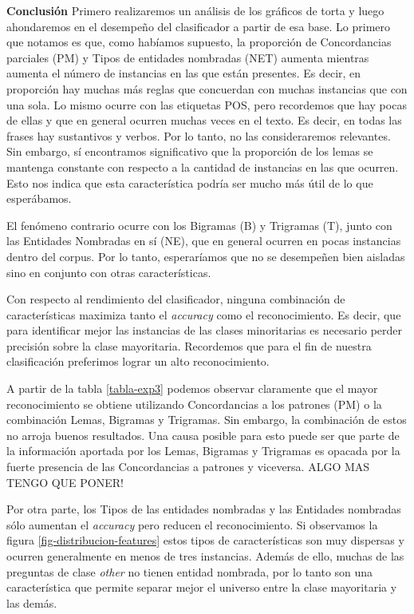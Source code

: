 \textbf{Conclusión} Primero realizaremos un análisis de los gráficos de torta y luego ahondaremos en el desempeño del clasificador a partir de esa base. Lo primero que notamos es que, como habíamos supuesto, la proporción de Concordancias parciales (PM) y Tipos de entidades nombradas (NET) aumenta mientras aumenta el número de instancias en las que están presentes. Es decir, en proporción hay muchas más reglas que concuerdan con muchas instancias que con una sola. Lo mismo ocurre con las etiquetas POS, pero recordemos que hay pocas de ellas y que en general ocurren muchas veces en el texto. Es decir, en todas las frases hay sustantivos y verbos. Por lo tanto, no las consideraremos relevantes. Sin embargo, sí encontramos significativo que la proporción de los lemas se mantenga constante con respecto a la cantidad de instancias en las que ocurren. Esto nos indica que esta característica podría ser mucho más útil de lo que esperábamos.

El fenómeno contrario ocurre con los Bigramas (B) y Trigramas (T), junto con las Entidades Nombradas en sí (NE), que en general ocurren en pocas instancias dentro del corpus. Por lo tanto, esperaríamos que no se desempeñen bien aisladas sino en conjunto con otras características.

Con respecto al rendimiento del clasificador, ninguna combinación de características maximiza tanto el \textit{accuracy} como el reconocimiento. Es decir, que para identificar mejor las instancias de las clases minoritarias es necesario perder precisión sobre la clase mayoritaria. Recordemos que para el fin de nuestra clasificación preferimos lograr un alto reconocimiento.

A partir de la tabla \ref{tabla-exp3} podemos observar claramente que el mayor reconocimiento se obtiene utilizando Concordancias a los patrones (PM) o la combinación Lemas, Bigramas y Trigramas. Sin embargo, la combinación de estos no arroja buenos resultados. Una causa posible para esto puede ser que parte de la información aportada por los Lemas, Bigramas y Trigramas es opacada por la fuerte presencia de las Concordancias a patrones y viceversa. ALGO MAS TENGO QUE PONER!

Por otra parte, los Tipos de las entidades nombradas y las Entidades nombradas sólo aumentan el \textit{accuracy} pero reducen el reconocimiento. Si observamos la figura \ref{fig-distribucion-features} estos tipos de características son muy dispersas y ocurren generalmente en menos de tres instancias. Además de ello, muchas de las preguntas de clase \textit{other} no tienen entidad nombrada, por lo tanto son una característica que permite separar mejor el universo entre la clase mayoritaria y las demás.

